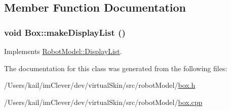 \subsection{Member Function Documentation}
\hypertarget{class_robot_model_1_1_box_a29420d81c8b3622c95a1976593e2cc4b}{
\subsubsection[{makeDisplayList}]{\setlength{\rightskip}{0pt plus 5cm}void Box::makeDisplayList ()}}
\label{class_robot_model_1_1_box_a29420d81c8b3622c95a1976593e2cc4b}


Implements \hyperlink{class_robot_model_1_1_display_list_a842de97924298c7363e50aebd69e5a50}{RobotModel::DisplayList}.

The documentation for this class was generated from the following files:\begin{DoxyCompactItemize}
\item 
/Users/kail/imClever/dev/virtualSkin/src/robotModel/\hyperlink{box_8h}{box.h}\item 
/Users/kail/imClever/dev/virtualSkin/src/robotModel/\hyperlink{box_8cpp}{box.cpp}\end{DoxyCompactItemize}
